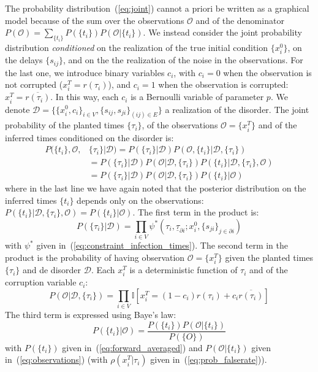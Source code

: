 \documentclass[a4paper, amsfonts, amssymb, amsmath, reprint, showkeys, nofootinbib, twoside, floatfix, pre,superscriptaddress]{revtex4-2}
\begin{document}
The probability distribution~(\ref{eq:joint}) cannot a priori be written as a graphical model because of the sum over the observations $\mathcal{O}$ and of the denominator $P(\mathcal{O})=\sum_{\{t_i\}}P(\{t_i\})P(\mathcal{O}|\{t_i\})$. 
We instead consider the joint probability distribution {\it conditioned} on the realization of the true initial condition $\{x_i^0\}$, on the delays $\{s_{ij}\}$, and on the the realization of the noise in the observations. 
For the last one, we introduce binary variables $c_i$, with $c_i=0$ when the observation is not corrupted ($x_i^T=r(\tau_i)$), and $c_i=1$ when the observation is corrupted: $x_i^T=\overline{r(\tau_i)}$. In this way, each $c_i$ is a Bernoulli variable of parameter $p$.
We denote $\mathcal{D}=\{\{x_i^0, c_i\}_{i\in V}, \{s_{ij},s_{ji}\}_{(ij)\in E}\}$ a realization of the disorder.
The joint probability of the planted times $\{\tau_i\}$, of the observations $\mathcal{O}=\{x_i^T\}$ and of the inferred times conditioned on the disorder is:
\begin{align*}
	P(\{t_i\},\mathcal{O},&\{\tau_i\}|\mathcal{D}) = P(\{\tau_i\}|\mathcal{D})P(\mathcal{O}, \{t_i\}|\mathcal{D},\{\tau_i\}) \\
	&=P(\{\tau_i\}|\mathcal{D})P(\mathcal{O}|\mathcal{D},\{\tau_i\})P(\{t_i\}|\mathcal{D},\{\tau_i\}, \mathcal{O})\\
	&=P(\{\tau_i\}|\mathcal{D})P(\mathcal{O}|\mathcal{D},\{\tau_i\})P(\{t_i\}|\mathcal{O})
\end{align*}
where in the last line we have again noted that the posterior distribution on the inferred times $\{t_i\}$ depends only on the observations: $P(\{t_i\}|\mathcal{D},\{\tau_i\}, \mathcal{O})=P(\{t_i\}|\mathcal{O})$.
The first term in the product is:
$$
	P(\{\tau_i\}|\mathcal{D})=\prod_{i\in V}\psi^*(\tau_i, \underline{\tau}_{\partial i};x_i^0, \{s_{ji}\}_{j\in\partial i})
$$
with $\psi^*$ given in~(\ref{eq:constraint_infection_times}).
The second term in the product is the probability of having observation $\mathcal{O}=\{x_i^T\}$ given the planted times $\{\tau_i\}$ and de disorder $\mathcal{D}$. Each $x_i^T$ is a deterministic function of $\tau_i$ and of the corruption variable $c_i$:
$$
	P(\mathcal{O}|\mathcal{D},\{\tau_i\}) = \prod_{i\in V}\mathbb{I}[x_i^T=(1-c_i)r(\tau_i)+c_i\overline{r(\tau_i)}]
$$
The third term is expressed using Baye's law:
$$
	P(\{t_i\}|\mathcal{O})=\frac{P(\{t_i\})P(\mathcal{O}|\{t_i\})}{P(\{O\})}
$$
with $P(\{t_i\})$ given in~(\ref{eq:forward_averaged}) and $P(\mathcal{O}|\{t_i\})$ given in~(\ref{eq:observations}) (with $\rho(x_i^T|\tau_i)$ given in~(\ref{eq:prob_falserate})).
\end{document}
